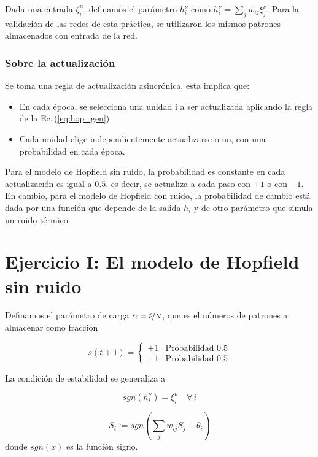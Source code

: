 Dada una entrada $\zeta ^\mu_i$, definamos el parámetro $h^\nu_i $ como $h^\nu_i = \sum_j w_{ij} \xi_j ^\nu$. Para la validación de las redes de esta práctica, se utilizaron los mismos patrones almacenados con entrada de la red. 

\subsubsection*{Sobre la actualización}

Se toma una regla de actualización asincrónica, esta implica que:

\begin{itemize}
	\item En cada época, se selecciona una unidad i a ser actualizada aplicando la regla de la Ec.\,(\ref{eq:hop_gen})
	\item Cada unidad elige independientemente actualizarse o no, con una probabilidad en cada época. 
\end{itemize}

Para el modelo de Hopfield sin ruido, la probabilidad es constante en cada actualización es igual a $0.5$, es decir, se actualiza a cada paso con $+1$ o con $-1$. En cambio, para el modelo de Hopfield con ruido, la probabilidad de cambio está dada por una función que depende de la salida $h_i$ y de otro parámetro que simula un ruido térmico.


\section*{Ejercicio I: El modelo de Hopfield sin ruido}

Definamos el parámetro de carga $\alpha  = \nicefrac{p}{N}$, que es el números de patrones a almacenar como fracción 

\begin{equation}
	s(t+1)=  \begin{cases} 
   +1 & \text{Probabilidad }0.5 \\
   -1 & \text{Probabilidad }0.5 
\end{cases}
\end{equation}

La condición de estabilidad se generaliza a

\begin{equation}
	sgn(h^\nu _i ) = \xi_i^\nu \quad \forall \,i
\end{equation}


\begin{equation}
	S_i := sgn(\sum_j w_{ij} S_j - \theta_i)
\end{equation}
donde $sgn(x)$ es la función signo.

